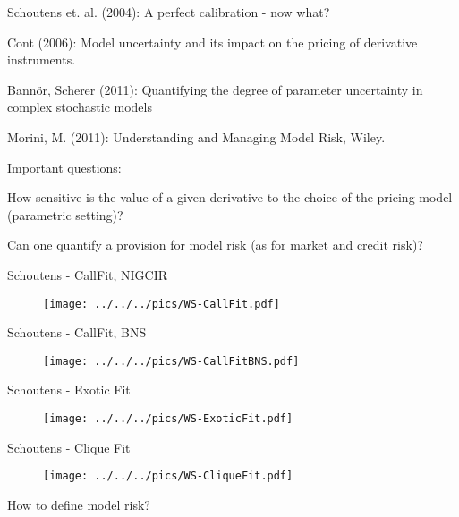 	Schoutens et. al. (2004): A perfect calibration - now what?

	Cont (2006): Model uncertainty and its impact on the pricing of derivative instruments.

	Bann{\"o}r, Scherer (2011): Quantifying the degree of parameter uncertainty in complex stochastic models

	Morini, M. (2011): Understanding and Managing Model Risk, Wiley.






	Important questions:






	How sensitive is the value of a given derivative to the choice of the pricing model (parametric setting)?

	Can one quantify a provision for model risk (as for market and credit risk)?











{Schoutens - CallFit, NIGCIR}
\begin{figure}[htp]
\centering
\texttt{[image: ../../../pics/WS-CallFit.pdf]}
\end{figure}

{Schoutens - CallFit, BNS}
\begin{figure}[htp]
\centering
\texttt{[image: ../../../pics/WS-CallFitBNS.pdf]}
\end{figure}

{Schoutens - Exotic Fit}
\begin{figure}[htp]
\centering
\texttt{[image: ../../../pics/WS-ExoticFit.pdf]}
\end{figure}

{Schoutens - Clique Fit}
\begin{figure}[htp]
\centering
\texttt{[image: ../../../pics/WS-CliqueFit.pdf]}
\end{figure}

{How to define model risk?}



